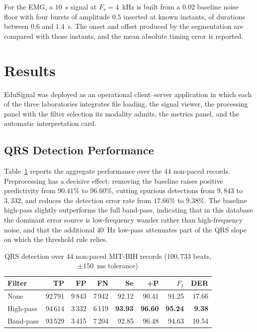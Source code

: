 \documentclass[conference]{IEEEtran}
\begin{document}
For the EMG, a $10$~s signal at $F_s=4$~kHz is built from a $0.02$ baseline noise floor with four bursts of amplitude $0.5$ inserted at known instants, of durations between $0.6$ and $1.4$~s. The onset and offset produced by the segmentation are compared with those instants, and the mean absolute timing error is reported.

\section{Results}
\label{sec:results}

EduSignal was deployed as an operational client--server application in which each of the three laboratories integrates file loading, the signal viewer, the processing panel with the filter selection its modality admits, the metrics panel, and the automatic interpretation card.


\subsection{QRS Detection Performance}
\label{sec:results-qrs}

Table~\ref{tab:qrs} reports the aggregate performance over the 44 non-paced records. Preprocessing has a decisive effect: removing the baseline raises positive predictivity from $90.41\%$ to $96.60\%$, cutting spurious detections from $9{,}843$ to $3{,}332$, and reduces the detection error rate from $17.66\%$ to $9.38\%$. The baseline high-pass slightly outperforms the full band-pass, indicating that in this database the dominant error source is low-frequency wander rather than high-frequency noise, and that the additional $40$~Hz low-pass attenuates part of the QRS slope on which the threshold rule relies.

\begin{table}[!t]
\caption{QRS detection over 44 non-paced MIT-BIH records ($100{,}733$ beats, $\pm150$~ms tolerance)}
\centering
\renewcommand{\arraystretch}{1.15}
\begin{tabular}{lrrrrrrr}
\toprule
\textbf{Filter} & \textbf{TP} & \textbf{FP} & \textbf{FN} & \textbf{Se} & \textbf{+P} & \textbf{$F_1$} & \textbf{DER}\\
\midrule
None       & 92\,791 & 9\,843 & 7\,942 & 92.12 & 90.41 & 91.25 & 17.66\\
High-pass  & 94\,614 & 3\,332 & 6\,119 & \textbf{93.93} & \textbf{96.60} & \textbf{95.24} & \textbf{9.38}\\
Band-pass  & 93\,529 & 3\,415 & 7\,204 & 92.85 & 96.48 & 94.63 & 10.54\\
\bottomrule
\end{tabular}
\label{tab:qrs}
\end{table}
\end{document}
